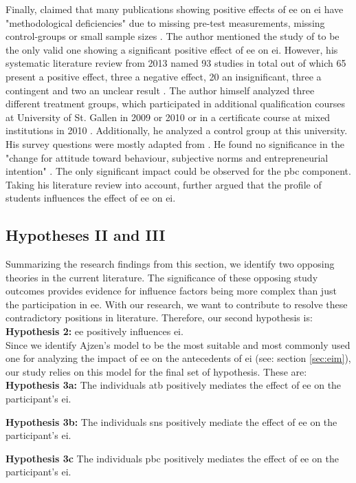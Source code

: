 Finally, \citet{lorz2013entrepreneurship} claimed that many publications showing positive effects of \ac{ee} on \ac{ei} have "methodological deficiencies" \citep[p. 1]{lorz2011impact} due to missing pre-test measurements, missing control-groups or small sample sizes \citep{lorz2011impact}. The author mentioned the study of \citet{peterman2003enterprise} to be the only valid one showing a significant positive effect of \ac{ee} on \ac{ei}. However, his systematic literature review from 2013 named 93 studies in total out of which 65 present a positive effect, three a negative effect, 20 an insignificant, three a contingent and two an unclear result \citep{lorz2013entrepreneurship}. The author himself analyzed three different treatment groups, which participated in additional qualification courses at University of St. Gallen in 2009 or 2010 or in a certificate course  at mixed institutions in 2010 \citep{lorz2011impact}. Additionally, he analyzed a control group at this university. His survey questions were mostly adapted from \citet{linan2009development}. He found no significance in the "change for attitude toward behaviour, subjective norms and entrepreneurial intention" \citep[p. 73]{lorz2011impact}. The only significant impact could be observed for the \ac{pbc} component. Taking his literature review into account, \citet{lorz2013entrepreneurship} further argued that the profile of students influences the effect of \ac{ee} on \ac{ei}.

\subsection{Hypotheses II and III }
\label{sec:hyp-II-III}
Summarizing the research findings from this section, we identify two opposing theories in the current literature. The significance of these opposing study outcomes provides evidence for influence factors being more complex than just the participation in \ac{ee}. With our research, we want to contribute to resolve these contradictory positions in literature. Therefore, our second hypothesis is:\\

\textbf{Hypothesis 2:} \acl{ee} positively influences \acl{ei}.\\

Since we identify Ajzen's model to be the most suitable and most commonly used one for analyzing the impact of \ac{ee} on the antecedents of \ac{ei} (see: section \ref{sec:eim}), our study relies on this model for the final set of hypothesis. These are:\\

\textbf{Hypothesis 3a:} The individuals \acl{atb} positively mediates the effect of \acl{ee} on the participant's \acl{ei}.

\textbf{Hypothesis 3b:} The individuals \aclp{sn} positively mediate the effect of \acl{ee} on the participant's \acl{ei}.

\textbf{Hypothesis 3c} The individuals \acl{pbc} positively mediates the effect of \acl{ee} on the participant's \acl{ei}.

